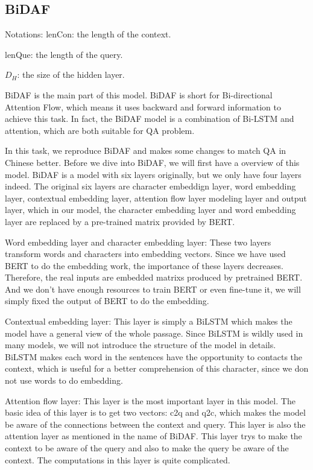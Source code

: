 \documentclass{article}
\begin{document}
\subsection{BiDAF}

Notations: 
lenCon: the length of the context.

lenQue: the length of the query.

$D_H$: the size of the hidden layer.

BiDAF is the main part of this model. BiDAF is short for Bi-directional Attention Flow, which means it uses backward and forward information to achieve this task. In fact, the BiDAF model is a combination of Bi-LSTM and attention, which are both suitable for QA problem.

In this task, we reproduce BiDAF and makes some changes to match QA in Chinese better. Before we dive into BiDAF, we will first have a overview of this model. BiDAF is a model with six layers originally, but we only have four layers indeed. The original six layers are character embeddign layer, word embedding layer, contextual embedding layer, attention flow layer modeling layer and output layer, which in our model, the character embedding layer and word embedding layer are replaced by a pre-trained matrix provided by BERT. 

Word embedding layer and character embedding layer: These two layers transform words and characters into embedding vectors. Since we have used BERT to do the embedding work, the importance of these layers decreases. Therefore, the real inputs are embedded matrixs produced by pretrained BERT. And we don't have enough resources to train BERT or even fine-tune it, we will simply fixed the output of BERT to do the embedding.

Contextual embedding layer: This layer is simply a BiLSTM which makes the model have a general view of the whole passage. Since BiLSTM is wildly used in many models, we will not introduce the structure of the model in details. BiLSTM makes each word in the sentences have the opportunity to contacts the context, which is useful for a better comprehension of this character, since we don not use words to do embedding.

Attention flow layer: This layer is the most important layer in this model. The basic idea of this layer is to get two vectors: c2q and q2c, which makes the model be aware of the connections between the context and query. This layer is also the attention layer as mentioned in the name of BiDAF. This layer trys to make the context to be aware of the query and also to make the query be aware of the context. The computations in this layer is quite complicated. 
\end{document}
